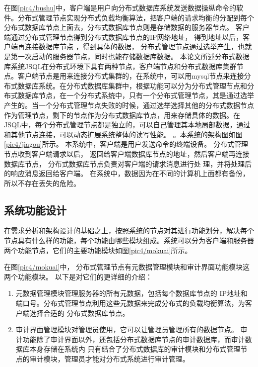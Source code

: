 在图\ref{pic4/bushu}中，客户端是用户向分布式数据库系统发送数据操纵命令的软件。分布式管理节点实现分布式负载均衡算法，把客户端的请求均衡的分配到每个分布式数据库节点上面去，分布式数据库节点则是存储数据的服务器节点。
客户端通过分布式管理节点得到分布式数据库节点的IP网络地址，
得到地址以后，客户端再连接数据库节点
，得到具体的数据，
分布式管理节点通过选举产生，也就是第一次启动的服务器节点，同时也能存储数据库数据。
本论文所述分布式数据库系统JSQL在分布式环境下具有两种节点，客户端节点和分布式数据库集群节点。客户端节点是用来连接分布式集群的，在系统中，可以用mysql节点来连接分布式数据库系统。在分布式数据库集群中，根据功能可以分为分布式管理节点和分布式数据库节点，在一个分布式系统中，只有一个分布式管理节点，其是通过选举产生的。当一个分布式管理节点失败的时候，通过选举选择其他的分布式数据节点作为管理节点，剩下的节点作为分布式数据库节点，用来存储具体的数据。在JSQL中，每个分布式管理节点都是独立的，可以自己管理其本地局部数据，通过和其他节点连接，可以动态扩展系统整体的读写性能。
。本系统的架构图如图\ref{pic4/jiagou}所示。
本系统中，客户端是用户发送命令的终端设备。
分布式管理节点收到客户端请求以后，
返回给客户端数据库节点的地址，然后客户端再连接数据库节点，
分布式数据库节点负责对客户端的请求消息进行处
理，并将处理后的响应消息返回给客户端。
在系统中，数据因为在不同的计算机上面都有备份，所以不存在丢失的危险。
\subsection{系统功能设计}
在需求分析和架构设计的基础之上，按照系统的节点对其进行功能划分，解决每个节点具有什么样的功能，每个功能由哪些模块组成。系统可以分为客户端和服务器两个功能节点，它们的主要功能模块如图\ref{pic4/mokuai}所示。

在图\ref{pic4/mokuai}中，
分布式管理节点有元数据管理模块和审计界面功能模块这两个功能模块。
以下是对它们的更详细的介绍：
\begin{enumerate}[fullwidth,itemindent=2em,listparindent=2em]
	\item 元数据管理模块管理服务器的所有元数据，包括每个数据库节点的
	IP地址和端口号。分布式管理节点利用这些元数据来完成分布式的负载均衡算法，为客户端选择合适的
	分布式数据库节点。
	\item 审计界面管理模块对管理员使用，它可以让管理员管理所有的数据节点。
	审计功能除了审计界面以外，还包括分布式数据库节点的审计数据库，而审计数据库本身存储在系统内
	只有结合了分布式数据库的审计模块和分布式管理节点的审计模块，管理员才能对分布式系统进行审计管理。
\end{enumerate}

